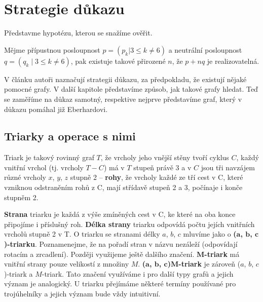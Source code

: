
\chapter{Strategie důkazu}

Představme hypotézu, kterou se snažíme ověřit.
\begin{hypot}\label{veta02:hypoteza}
Mějme přípustnou posloupnost $p=(p_k | 3 \leq k \neq 6)$ a neutrální posloupnost $q=(q_k \mid 3 \leq k \neq 6)$, pak existuje takové přirozené $n$, že $p+nq$ je realizovatelná.
\end{hypot}


V článku \cite{Samal09} autoři naznačují strategii důkazu, za předpokladu, že existují nějaké pomocné grafy. V další kapitole představíme způsob, jak takové grafy hledat. Teď se zaměříme na důkaz samotný, respektive nejprve představíme graf, který v důkazu pomáhal již Eberhardovi.

\section{Triarky a operace s nimi}

\begin{definice}[Triark]\label{def02:1}
Triark je takový rovinný graf $T$, že vrcholy jeho vnější stěny tvoří cyklus $C$, každý vnitřní vrchol (tj. vrcholy $T-C$) má v $T$ stupeň právě 3 a v $C$ jsou tři navzájem různé vrcholy $x$, $y$, $z$ stupně 2 -- \textbf{rohy}, že vrcholy každé ze tří cest v C, které vzniknou odstraněním rohů z C, mají střídavě stupeň 2 a 3, počínaje i konče stupněm 2.
\end{definice}

\textbf{Strana} triarku je každá z výše zmíněných cest v C, ke které na oba konce připojíme i příslušný roh. \textbf{Délka strany} triarku odpovídá počtu jejích vnitřních vrcholů stupně 2 v T. O triarku se stranami délky $a$, $b$, $c$ mluvíme jako o \textbf{($\boldsymbol{a}$, $\boldsymbol{b}$, $\boldsymbol{c}$)-triarku}. Poznamenejme, že na pořadí stran v názvu nezáleží (odpovídají rotacím a zrcadlení). Později využijeme ještě dalšího značení. \textbf{$\boldsymbol{M}$-triark} má vnitřní strany pouze velikostí z množiny $M$. \textbf{($\boldsymbol{a}$, $\boldsymbol{b}$, $\boldsymbol{c}$)$\boldsymbol{M}$-triark} je zároveň ($a$, $b$, $c$)-triark a $M$-triark. Tato značení využíváme i pro další typy grafů a jejich význam je analogický. U triarku přejímáme některé termíny používané pro trojúhelníky a jejich význam bude vždy intuitivní.

